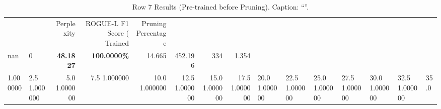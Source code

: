 \begin{table}
\caption{Row 7 Results (Pre-trained before Pruning). \ifshowcaption{}Caption: ``''.\fi}
\label{tab:evaluation-pipeline-7-trained}
\begin{tabular}{llrrrrrr}
 &  & Perplexity & ROGUE-L F1 Score (%
Trained & Pruning Percentage &  &  &  &  &  &  \\
nan & 0 & \bfseries 48.1827 & \bfseries 100.0000\% & 14.665 & 452.196 & 334 & 1.354 \\
1.000000 & 2.5%
1.000000 & 5.0%
1.000000 & 7.5%
1.000000 & 10.0%
1.000000 & 12.5%
1.000000 & 15.0%
1.000000 & 17.5%
1.000000 & 20.0%
1.000000 & 22.5%
1.000000 & 25.0%
1.000000 & 27.5%
1.000000 & 30.0%
1.000000 & 32.5%
1.000000 & 35.0%

\end{tabular}
\end{table}
